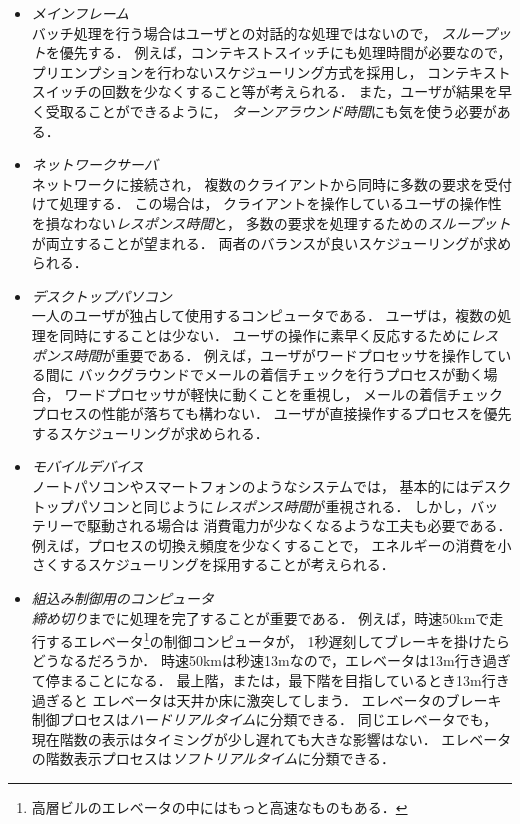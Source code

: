 \begin{itemize}
\item \emph{メインフレーム} \\
  バッチ処理を行う場合はユーザとの対話的な処理ではないので，
  \emph{スループット}を優先する．
  例えば，コンテキストスイッチにも処理時間が必要なので，
  プリエンプションを行わないスケジューリング方式を採用し，
  コンテキストスイッチの回数を少なくすること等が考えられる．
  また，ユーザが結果を早く受取ることができるように，
  \emph{ターンアラウンド時間}にも気を使う必要がある．
\item \emph{ネットワークサーバ} \\
  ネットワークに接続され，
  複数のクライアントから同時に多数の要求を受付けて処理する．
  この場合は，
  クライアントを操作しているユーザの操作性を損なわない\emph{レスポンス時間}と，
  多数の要求を処理するための\emph{スループット}が両立することが望まれる．
  両者のバランスが良いスケジューリングが求められる．
\item \emph{デスクトップパソコン} \\
  一人のユーザが独占して使用するコンピュータである．
  ユーザは，複数の処理を同時にすることは少ない．
  ユーザの操作に素早く反応するために\emph{レスポンス時間}が重要である．
  例えば，ユーザがワードプロセッサを操作している間に
  バックグラウンドでメールの着信チェックを行うプロセスが動く場合，
  ワードプロセッサが軽快に動くことを重視し，
  メールの着信チェックプロセスの性能が落ちても構わない．
  ユーザが直接操作するプロセスを優先するスケジューリングが求められる．
\item \emph{モバイルデバイス} \\
  ノートパソコンやスマートフォンのようなシステムでは，
  基本的にはデスクトップパソコンと同じように\emph{レスポンス時間}が重視される．
  しかし，バッテリーで駆動される場合は
  消費電力が少なくなるような工夫も必要である．
  例えば，プロセスの切換え頻度を少なくすることで，
  エネルギーの消費を小さくするスケジューリングを採用することが考えられる．
\item \emph{組込み制御用のコンピュータ} \\
  \emph{締め切り}までに処理を完了することが重要である．
  例えば，時速50kmで走行するエレベータ\footnote{
    高層ビルのエレベータの中にはもっと高速なものもある．
  }の制御コンピュータが，
  1秒遅刻してブレーキを掛けたらどうなるだろうか．
  時速50kmは秒速13mなので，エレベータは13m行き過ぎて停まることになる．
  最上階，または，最下階を目指しているとき13m行き過ぎると
  エレベータは天井か床に激突してしまう．
  エレベータのブレーキ制御プロセスは\emph{ハードリアルタイム}に分類できる．
  同じエレベータでも，
  現在階数の表示はタイミングが少し遅れても大きな影響はない．
  エレベータの階数表示プロセスは\emph{ソフトリアルタイム}に分類できる．
\end{itemize}

